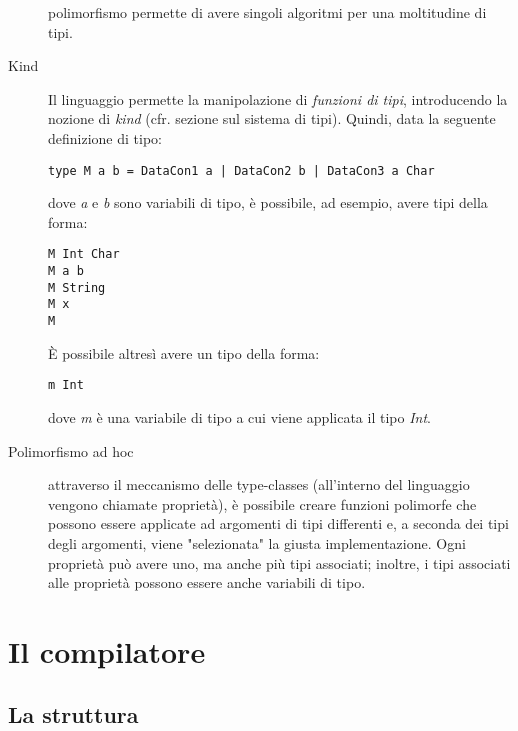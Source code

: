 \documentclass[10pt,a4paper]{article}
\begin{document}
\begin{description}
polimorfismo permette di avere singoli algoritmi per una moltitudine di tipi.
\item[Kind] Il linguaggio permette la manipolazione di \textit{funzioni di tipi}, introducendo la nozione di
\textit{kind} (cfr. sezione sul sistema di tipi). Quindi, data la seguente definizione di tipo:
\begin{lstlisting}
type M a b = DataCon1 a | DataCon2 b | DataCon3 a Char
\end{lstlisting}
dove \textit{a} e \textit{b} sono variabili di tipo, è possibile, ad esempio, avere tipi della forma:
\begin{lstlisting}
M Int Char
M a b
M String
M x
M
\end{lstlisting}
\`E possibile altresì avere un tipo della forma:
\begin{lstlisting}
m Int
\end{lstlisting}
dove \textit{m} è una variabile di tipo a cui viene applicata il tipo \textit{Int}.
\item[Polimorfismo ad hoc] attraverso il meccanismo delle type-classes (all'interno del linguaggio vengono chiamate
proprietà), è possibile creare funzioni polimorfe che possono essere applicate ad argomenti di tipi differenti e, a
seconda dei tipi degli argomenti, viene "selezionata" la giusta implementazione. Ogni proprietà può avere uno, ma anche
più tipi associati; inoltre, i tipi associati alle proprietà possono essere anche variabili di tipo.

\end{description}

\section{Il compilatore}

\subsection{La struttura}
\end{document}

